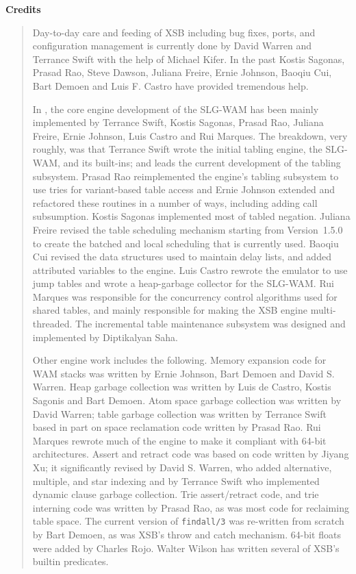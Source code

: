 \begin{center}
{\bf {\Large 
		Credits
}}
\end{center}


\begin{quote}
Day-to-day care and feeding of XSB including bug fixes, ports, and
configuration management is currently done by David Warren and
Terrance Swift with the help of Michael Kifer.  In the past Kostis
Sagonas, Prasad Rao, Steve Dawson, Juliana Freire, Ernie Johnson,
Baoqiu Cui, Bart Demoen and Luis F.  Castro have provided tremendous
help.

In \version, the core engine development of the SLG-WAM has been
mainly implemented by Terrance Swift, Kostis Sagonas, Prasad Rao,
Juliana Freire, Ernie Johnson, Luis Castro and Rui Marques.  The
breakdown, very roughly, was that Terrance Swift wrote the initial
tabling engine, the SLG-WAM, and its built-ins; and leads the current
development of the tabling subsystem.  Prasad Rao reimplemented the
engine's tabling subsystem to use tries for variant-based table access
and Ernie Johnson extended and refactored these routines in a number
of ways, including adding call subsumption.  Kostis Sagonas
implemented most of tabled negation.  Juliana Freire revised the table
scheduling mechanism starting from Version~1.5.0 to create the batched
and local scheduling that is currently used.  Baoqiu Cui revised the
data structures used to maintain delay lists, and added attributed
variables to the engine.  Luis Castro rewrote the emulator to use jump
tables and wrote a heap-garbage collector for the SLG-WAM.  Rui
Marques was responsible for the concurrency control algorithms used
for shared tables, and mainly responsible for making the XSB engine
multi-threaded.  The incremental table maintenance subsystem was
designed and implemented by Diptikalyan Saha.

Other engine work includes the following.  Memory expansion code for
WAM stacks was written by Ernie Johnson, Bart Demoen and David
S. Warren.  Heap garbage collection was written by Luis de Castro,
Kostis Sagonis and Bart Demoen.  Atom space garbage collection was
written by David Warren; table garbage collection was written by
Terrance Swift based in part on space reclamation code written by
Prasad Rao.  Rui Marques rewrote much of the engine to make it
compliant with 64-bit architectures.  Assert and retract code was
based on code written by Jiyang Xu; it significantly revised by David
S. Warren, who added alternative, multiple, and star indexing and by
Terrance Swift who implemented dynamic clause garbage collection. Trie
assert/retract code, and trie interning code was written by Prasad
Rao, as was most code for reclaiming table space. The current version
of {\tt findall/3} was re-written from scratch by Bart Demoen, as was
XSB's throw and catch mechanism.  64-bit floats were added by Charles
Rojo.  Walter Wilson has written several of XSB's builtin predicates.


\end{quote}
